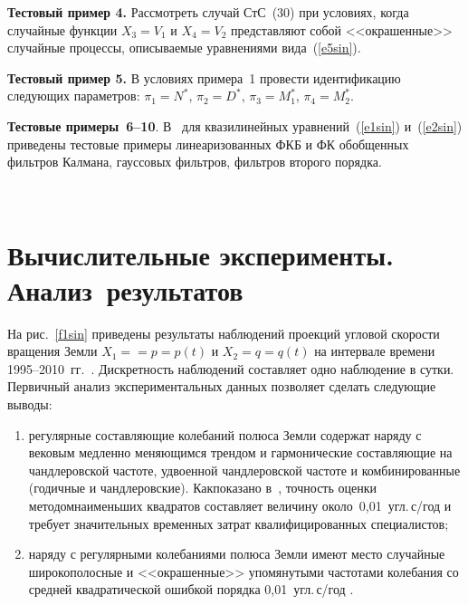 \begin{multicols}{2}
\smallskip

\noindent
\textbf{Тестовый пример 4.}
 Рассмотреть случай СтС~(30)  
 при условиях, когда случайные функции $X_3=V_1$ и $X_4=V_2$ представляют собой <<окрашенные>> 
 случайные процессы, описываемые уравнениями вида~(\ref{e5sin}).

\smallskip

\noindent
\textbf{Тестовый пример 5.}
 В условиях примера~1 провести идентификацию следующих параметров: 
 $\pi_1 = N^*$, $\pi_2=D^*$, $\pi_3= M_1^*$, $\pi_4=M_2^*$.

\smallskip

\noindent
\textbf{Тестовые примеры~6--10}.
 В~\cite{4sin} для квазилинейных уравнений~(\ref{e1sin}) и~(\ref{e2sin}) 
 приведены тестовые примеры линеаризованных ФКБ и ФК обобщенных фильт\-ров 
 Калмана, гауссовых фильтров, фильтров второго порядка.
 
 \begin{figure*}[b] %
\vspace*{1pt}
\begin{center}
\mbox{%
\epsfxsize=165.451mm
}
\end{center}
\vspace*{-9pt}
\end{figure*}

\section{Вычислительные эксперименты. Анализ~результатов}

На рис.~\ref{f1sin} приведены результаты наблюдений проекций угловой скорости вращения 
Земли $X_1=$\linebreak $=p=p(t)$ и $X_2=q=q(t)$ на интервале времени 1995--2010~гг.~\cite{10sin}. 
Дискретность наблюдений составляет одно наблюдение в сутки. Первичный анализ экспериментальных 
данных позволяет сделать следующие выводы:

\noindent
\begin{enumerate}[(1)]
\item регулярные составляющие колебаний полюса Земли содержат наряду с вековым медленно меняющимся 
трендом и гармонические со\-став\-ля\-ющие на чандлеровской частоте, удвоенной чандлеровской частоте и 
комбинированные (годичные и чандлеровские). Как\linebreak показано в~\cite{11sin}, 
точность оценки методом\linebreak наименьших квадратов составляет величину около~0,01~угл.\,с/год 
и требует значительных временных затрат квалифицированных специалистов;
\item
наряду с регулярными колебаниями полюса Земли имеют место случайные широкополосные и <<окрашенные>> 
упомянутыми частотами колебания со сред\-ней квад\-ра\-ти\-че\-ской ошибкой порядка 0,01~угл.\,с/год .
\end{enumerate}


\end{multicols}
